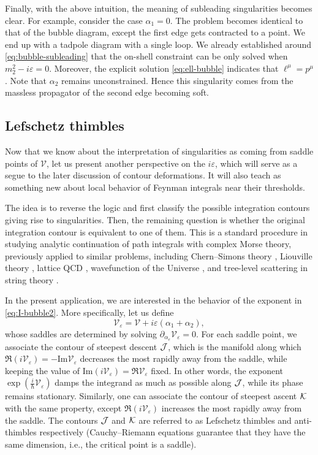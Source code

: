 \documentclass[12pt]{article}
\numberwithin{figure}{section}
\def \be {\begin{equation}}
\def \ee {\end{equation}}
\def \eps {\varepsilon}
\def \V {\mathcal{V}}
\def \Im {\mathrm{Im}}
\begin{document}
	Finally, with the above intuition, the meaning of subleading singularities becomes clear. For example, consider the case $\alpha_1=0$. The problem becomes identical to that of the bubble diagram, except the first edge gets contracted to a point. We end up with a tadpole diagram with a single loop. We already established around \eqref{eq:bubble-subleading} that the on-shell constraint can be only solved when $m_2^2 - i\eps = 0$. Moreover, the explicit solution \eqref{eq:ell-bubble} indicates that $\ell^\mu = p^\mu$. Note that $\alpha_2$ remains unconstrained. Hence this singularity comes from the massless propagator of the second edge becoming soft.
	
	
	\subsection{\label{sec:thimbles}Lefschetz thimbles}
	
	Now that we know about the interpretation of singularities as coming from saddle points of $\V$, let us present another perspective on the $i\eps$, which will serve as a segue to the later discussion of contour deformations. It will also teach as something new about local behavior of Feynman integrals near their thresholds.
	
	The idea is to reverse the logic and first classify the possible integration contours giving rise to singularities. Then, the remaining question is whether the original integration contour is equivalent to one of them. This is a standard procedure in studying analytic continuation of path integrals with complex Morse theory, previously applied to similar problems, including Chern--Simons theory \cite{Witten:2010cx}, Liouville theory \cite{Harlow:2011ny}, lattice QCD \cite{Cristoforetti:2012su}, wavefunction of the Universe \cite{Feldbrugge:2017kzv}, and tree-level scattering in string theory \cite{Mizera:2019gea}. 
	
	In the present application, we are interested in the behavior of the exponent in \eqref{eq:I-bubble2}. More specifically, let us define
	\be
	\V_\eps = \V + i\eps(\alpha_1 + \alpha_2),
	\ee
	whose saddles are determined by solving $\partial_{\alpha_e} \V_\eps = 0$.
	For each saddle point, we associate the contour of steepest descent $\cal J$, which is the manifold along which $\Re (i\V_\eps) = - \Im \V_\eps$ decreases the most rapidly away from the saddle, while keeping the value of $\Im (i\V_\eps) = \Re \V_\eps$ fixed. In other words, the exponent $\exp(\tfrac{i}{\hbar}\V_\eps)$ damps the integrand as much as possible along $\cal J$, while its phase remains stationary. Similarly, one can associate the contour of steepest ascent $\cal K$ with the same property, except $\Re(i\V_\eps)$ increases the most rapidly away from the saddle. The contours $\cal J$ and $\cal K$ are referred to as Lefschetz thimbles and anti-thimbles respectively (Cauchy--Riemann equations guarantee that they have the same dimension, i.e., the critical point is a saddle).
	
\end{document}
